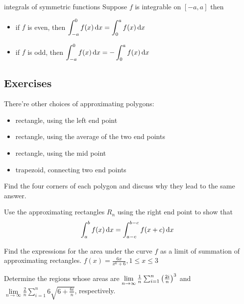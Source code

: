 \documentclass[Calculus 1 Recitation.tex]{subfiles}
\begin{document}
\begin{myleftlinebox}
	integrals of symmetric functions
	\tcblower
	Suppose $f$ is integrable on $[-a,a]$ then
	\begin{itemize}
		\item if $f$ is even, then $\displaystyle \int_{-a}^0 f(x)\,\mathrm{d} x=\int_0^a f(x)\,\mathrm{d} x$
		\item if $f$ is odd, then $\displaystyle \int_{-a}^0 f(x)\,\mathrm{d} x=-\int_0^a f(x)\,\mathrm{d} x$
	\end{itemize}
\end{myleftlinebox}

\subsection{Exercises}
\begin{myleftlinebox}
	There're other choices of approximating polygons:
	\begin{itemize}
		\item rectangle, using the left end point
		\item rectangle, using the average of the two end points
		\item rectangle, using the mid point
		\item trapezoid, connecting two end points
	\end{itemize}
	Find the four corners of each polygon and discuss why they lead to the same answer.
	\tcblower
	\vspace{2em}
\end{myleftlinebox}

\begin{myleftlinebox}
	Use the approximating rectangles $R_n$ using the right end point to show that
	\[\int_a^b f(x) \,\mathrm{d} x = \int_{a-c}^{b-c} f(x+c)\,\mathrm{d} x\]
\end{myleftlinebox}

\begin{myleftlinebox}
	Find the expressions for the area under the curve $f$ as a limit of summation of approximating rectangles. $f(x)=\frac{6x}{x^6+6}, 1\leq x\leq 3$
	\tcblower
	\vspace{2em}
\end{myleftlinebox}

\begin{myleftlinebox}
	Determine the regions whose areas are $\lim\limits_{n\to\infty} \frac{1}{n}\sum_{i=1}^n \left( \frac{2i}{n} \right)^3$ and $\lim\limits_{n\to\infty} \frac{2}{n}\sum_{i=1}^n 6\sqrt{6+\frac{6i}{n}}$, respectively.
	\tcblower
	\vspace{2em}
\end{myleftlinebox}
\end{document}
